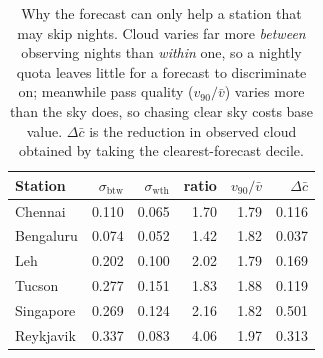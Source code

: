 \begin{table}[t]
\caption{Why the forecast can only help a station that may skip nights. Cloud varies far more \emph{between} observing nights than \emph{within} one, so a nightly quota leaves little for a forecast to discriminate on; meanwhile pass quality ($v_{90}/\bar v$) varies more than the sky does, so chasing clear sky costs base value. $\Delta \bar c$ is the reduction in observed cloud obtained by taking the clearest-forecast decile.}
\label{tab:structure}
\centering
\setlength{\tabcolsep}{4pt}
\begin{tabular}{lrrrrr}
\toprule
Station & $\sigma_{\mathrm{btw}}$ & $\sigma_{\mathrm{wth}}$ & ratio & $v_{90}/\bar v$ & $\Delta \bar c$ \\
\midrule
Chennai & 0.110 & 0.065 & 1.70 & 1.79 & 0.116 \\
Bengaluru & 0.074 & 0.052 & 1.42 & 1.82 & 0.037 \\
Leh & 0.202 & 0.100 & 2.02 & 1.79 & 0.169 \\
Tucson & 0.277 & 0.151 & 1.83 & 1.88 & 0.119 \\
Singapore & 0.269 & 0.124 & 2.16 & 1.82 & 0.501 \\
Reykjavik & 0.337 & 0.083 & 4.06 & 1.97 & 0.313 \\
\bottomrule
\end{tabular}
\end{table}

